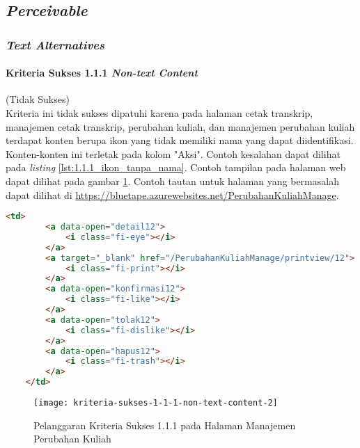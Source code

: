 \subsection{\textit{Perceivable}}
\label{subsec:kepatuhan_bluetape_perceivable}

\subsubsection{\textit{Text Alternatives}}
\label{subsubsec:kepatuhan_bluetape_text_alternatives}

\paragraph{Kriteria Sukses 1.1.1 \textit{Non-text Content}}
\label{par:kepatuhan_bluetape_kriteria_sukses_1.1.1}
(Tidak Sukses)\\

Kriteria ini tidak sukses dipatuhi karena pada halaman cetak transkrip, manajemen cetak transkrip, perubahan kuliah, dan manajemen perubahan kuliah terdapat konten berupa ikon yang tidak memiliki nama yang dapat diidentifikasi. Konten-konten ini terletak pada kolom "Aksi". Contoh kesalahan dapat dilihat pada \textit{listing} \ref{lst:1.1.1_ikon_tanpa_nama}. Contoh tampilan pada halaman web dapat dilihat pada gambar \ref{fig:1.1.1_non_text_content_2}. Contoh tautan untuk halaman yang bermasalah dapat dilihat di \url{https://bluetape.azurewebsites.net/PerubahanKuliahManage}.
\begin{lstlisting}[frame=single, label={lst:1.1.1_ikon_tanpa_nama}, language=HTML, caption=Pelanggaran Kriteria Sukses 1.1.1 pada Halaman Manajemen Perubahan Kuliah]
    <td>
        <a data-open="detail12">
            <i class="fi-eye"></i>
        </a>
        <a target="_blank" href="/PerubahanKuliahManage/printview/12">
            <i class="fi-print"></i>
        </a>
        <a data-open="konfirmasi12">
            <i class="fi-like"></i>
        </a>  
        <a data-open="tolak12">
            <i class="fi-dislike"></i>
        </a>
        <a data-open="hapus12">
            <i class="fi-trash"></i>
        </a>
    </td>
\end{lstlisting}

\begin{figure}[H]
    \centering  
    \texttt{[image: kriteria-sukses-1-1-1-non-text-content-2]}  
    \caption[Pelanggaran Kriteria Sukses 1.1.1 pada Halaman Manajemen Perubahan Kuliah]{Pelanggaran Kriteria Sukses 1.1.1 pada Halaman Manajemen Perubahan Kuliah}
    \label{fig:1.1.1_non_text_content_2}  
\end{figure} 


